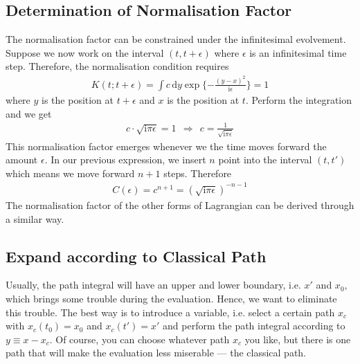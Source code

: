 \documentclass[letterpaper,10pt,english]{sphinxmanual}
\begin{document}
\subsection{Determination of Normalisation Factor}
\label{\detokenize{pi_eval:determination-of-normalisation-factor}}
The normalisation factor can be constrained under the infinitesimal evolvement. Suppose we now work on the interval \((t, t+\epsilon)\) where \(\epsilon\) is an infinitesimal time step. Therefore, the normalisation condition requires
\begin{equation*}
\begin{split}K(t; t+\epsilon) = \int c\,\mathrm{d}y \exp\{-\frac{(y-x)^2}{\mathrm{i}\epsilon}\} = 1\end{split}
\end{equation*}
where \(y\) is the position at \(t+\epsilon\) and \(x\) is the position at \(t\). Perform the integration and we get
\begin{equation*}
\begin{split}c\cdot \sqrt{\mathrm{i}\pi\epsilon} = 1 \ \ \Rightarrow\ \ c = \frac{1}{\sqrt{\mathrm{i}\pi\epsilon}}\end{split}
\end{equation*}
This normalisation factor emerges whenever we the time moves forward the amount \(\epsilon\). In our previous expression, we insert \(n\) point into the interval \((t,t')\) which means we move forward \(n+1\) steps. Therefore
\begin{equation*}
\begin{split}C(\epsilon) = c^{n+1} = (\sqrt{\mathrm{i}\pi\epsilon})^{-n-1}\end{split}
\end{equation*}
The normalisation factor of the other forms of Lagrangian can be derived through a similar way.


\subsection{Expand according to Classical Path}
\label{\detokenize{pi_eval:expand-according-to-classical-path}}
Usually, the path integral will have an upper and lower boundary, i.e. \(x'\) and \(x_0\), which brings some trouble during the evaluation. Hence, we want to eliminate this trouble. The best way is to introduce a  variable, i.e. select a certain path \(x_c\) with \(x_c(t_0) = x_0\) and \(x_c(t') = x'\) and perform the path integral according to \(y\equiv x - x_c\). Of course, you can choose whatever path \(x_c\) you like, but there is one path that will make the evaluation less miserable --- the classical path.
\end{document}
